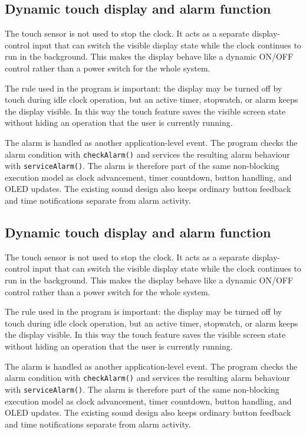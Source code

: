 \documentclass[12pt,letterpaper]{article}
\begin{document}

\subsection{Dynamic touch display and alarm function}

The touch sensor is not used to stop the clock. It acts as a separate
display-control input that can switch the visible display state while the
clock continues to run in the background. This makes the display behave like
a dynamic ON/OFF control rather than a power switch for the whole system.

The rule used in the program is important: the display may be turned off by
touch during idle clock operation, but an active timer, stopwatch, or alarm
keeps the display visible. In this way the touch feature saves the visible
screen state without hiding an operation that the user is currently running.

The alarm is handled as another application-level event. The program checks
the alarm condition with \texttt{checkAlarm()} and services the resulting
alarm behaviour with \texttt{serviceAlarm()}. The alarm is therefore part of
the same non-blocking execution model as clock advancement, timer countdown,
button handling, and OLED updates. The existing sound design also keeps
ordinary button feedback and time notifications separate from alarm activity.

\subsection{Dynamic touch display and alarm function}

The touch sensor is not used to stop the clock. It acts as a separate
display-control input that can switch the visible display state while the
clock continues to run in the background. This makes the display behave like
a dynamic ON/OFF control rather than a power switch for the whole system.

The rule used in the program is important: the display may be turned off by
touch during idle clock operation, but an active timer, stopwatch, or alarm
keeps the display visible. In this way the touch feature saves the visible
screen state without hiding an operation that the user is currently running.

The alarm is handled as another application-level event. The program checks
the alarm condition with \texttt{checkAlarm()} and services the resulting
alarm behaviour with \texttt{serviceAlarm()}. The alarm is therefore part of
the same non-blocking execution model as clock advancement, timer countdown,
button handling, and OLED updates. The existing sound design also keeps
ordinary button feedback and time notifications separate from alarm activity.
\end{document}
